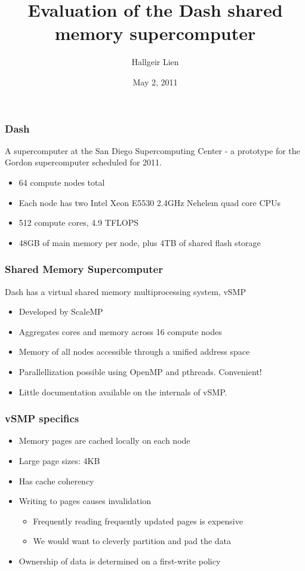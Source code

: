 \documentclass{beamer}
\title{Evaluation of the Dash shared memory supercomputer}
\author{Hallgeir Lien}
\date{May 2, 2011}
\begin{document}
\maketitle

\begin{frame}
\frametitle{Dash}
A supercomputer at the San Diego Supercomputing Center - a prototype for the Gordon supercomputer scheduled for 2011.
\pause
\begin{itemize}
\item 64 compute nodes total
\pause
\item Each node has two Intel Xeon E5530 2.4GHz Nehelem quad core CPUs
\pause
\item 512 compute cores, 4.9 TFLOPS
\pause
\item 48GB of main memory per node, plus 4TB of shared flash storage
\end{itemize}
\end{frame}

\begin{frame}
\frametitle{Shared Memory Supercomputer}
Dash has a virtual shared memory multiprocessing system, vSMP
\begin{itemize}
\item Developed by ScaleMP
\pause
\item Aggregates cores and memory across 16 compute nodes
\pause
\item Memory of all nodes accessible through a unified address space
\pause
\item Parallellization possible using OpenMP and pthreads. Convenient!
\pause
\item Little documentation available on the internals of vSMP.
\end{itemize}
\end{frame}

\begin{frame}
\frametitle{vSMP specifics}
\begin{itemize}
\item Memory pages are cached locally on each node
\pause
\item Large page sizes: 4KB
\pause
\item Has cache coherency
\pause
\item Writing to pages causes invalidation
    \begin{itemize}
        \item Frequently reading frequently updated pages is expensive
        \pause
        \item We would want to cleverly partition and pad the data
    \end{itemize}
\pause
\item Ownership of data is determined on a first-write policy
\end{itemize}
\end{frame}
\end{document}
